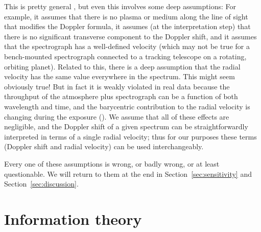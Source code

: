 \documentclass[modern]{aastex631}
\newcommand{\sectionname}{Section}
\newcommand{\secref}[1]{\sectionname~\ref{#1}}
\begin{document}
\begin{description}
    This is pretty general \citep{wright}, but even this involves some deep assumptions:
    For example, it assumes that there is no plasma or medium along the line of sight that modifies the Doppler formula,
    it assumes (at the interpretation step) that there is no significant transverse component to the Doppler shift,
    and it assumes that the spectrograph has a well-defined velocity (which may not be true for a bench-mounted spectrograph connected to a tracking telescope on a rotating, orbiting planet).
    Related to this, there is a deep assumption that the radial velocity has the same value everywhere in the spectrum.
    This might seem obviously true!
    But in fact it is weakly violated in real data because the throughput of the atmosphere plus spectrograph can be a function of both wavelength and time, and the barycentric contribution to the radial velocity is changing during the exposure (\citealt{berv-lambda}). 
    We assume that all of these effects are negligible, and the Doppler shift of a given spectrum can be straightforwardly interpreted in terms of a single radial velocity; thus for our purposes these terms (Doppler shift and radial velocity) can be used interchangeably.
\end{description}
Every one of these assumptions is wrong, or badly wrong, or at least questionable.
We will return to them at the end in \secref{sec:sensitivity} and \secref{sec:discussion}.

\section{Information theory}\label{sec:info}
\end{document}
